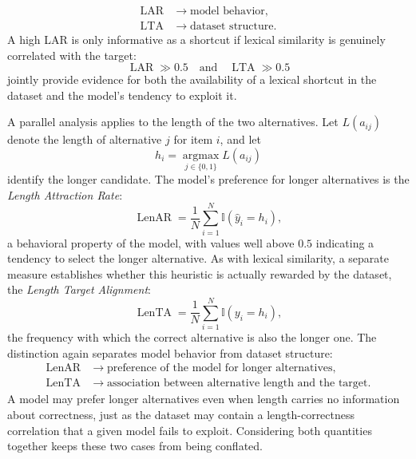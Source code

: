 \begin{description}
\begin{align}
\operatorname{LAR} &\rightarrow \text{model behavior}, \\
\operatorname{LTA} &\rightarrow \text{dataset structure}.
\end{align}
A high LAR is only informative as a shortcut if lexical similarity is genuinely correlated with the target:
\begin{equation}
\operatorname{LAR} \gg 0.5 \quad \text{and} \quad \operatorname{LTA} \gg 0.5
\end{equation}
jointly provide evidence for both the availability of a lexical shortcut in the dataset and the model's tendency to exploit it.
\item[Length Bias] A parallel analysis applies to the length of the two alternatives. Let \(L(a_{ij})\) denote the length of alternative \(j\) for item \(i\), and let
\begin{equation}
h_i = \operatorname*{argmax}_{j \in \{0,1\}} L(a_{ij})
\end{equation}
identify the longer candidate. The model's preference for longer alternatives is the \textit{Length Attraction Rate}:
\begin{equation}
\operatorname{LenAR} = \frac{1}{N} \sum_{i=1}^{N} \mathbb{I} \left(\hat{y}_i = h_i\right),
\end{equation}
a behavioral property of the model, with values well above \(0.5\) indicating a tendency to select the longer alternative. As with lexical similarity, a separate measure establishes whether this heuristic is actually rewarded by the dataset, the \textit{Length Target Alignment}:
\begin{equation}
\operatorname{LenTA} = \frac{1}{N} \sum_{i=1}^{N} \mathbb{I} \left(y_i = h_i\right),
\end{equation}
the frequency with which the correct alternative is also the longer one. The distinction again separates model behavior from dataset structure:
\begin{align}
\operatorname{LenAR} &\rightarrow \text{preference of the model for longer alternatives}, \\
\operatorname{LenTA} &\rightarrow \text{association between alternative length and the target}.
\end{align}
A model may prefer longer alternatives even when length carries no information about correctness, just as the dataset may contain a length-correctness correlation that a given model fails to exploit. Considering both quantities together keeps these two cases from being conflated.

\end{description}
